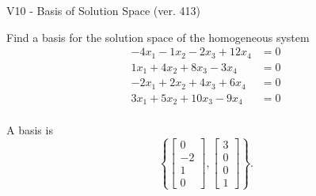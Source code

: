 \begin{exercise}
  \begin{exerciseTitle}V10 - Basis of Solution Space (ver. 413)\end{exerciseTitle}
  \begin{exerciseStatement}
    Find a basis for the solution space of the homogeneous system 
\begin{align*}
 -4 x_ 1 -1 x_ 2 -2 x_ 3 + 12 x_ 4 &= 0  \\ 
  1 x_ 1 + 4 x_ 2 + 8 x_ 3 -3 x_ 4 &= 0  \\ 
  -2 x_ 1 + 2 x_ 2 + 4 x_ 3 + 6 x_ 4 &= 0  \\ 
  3 x_ 1 + 5 x_ 2 + 10 x_ 3 -9 x_ 4 &= 0  \\ 
 \end{align*}


 
  \end{exerciseStatement}

  \begin{exerciseAnswer}
   A basis is   
\[\left\{\left[\begin{array}{c}
0 \\
-2 \\
1 \\
0
\end{array}\right] , \left[\begin{array}{c}
3 \\
0 \\
0 \\
1
\end{array}\right]\right\}.\]

  


  \end{exerciseAnswer}
\end{exercise}